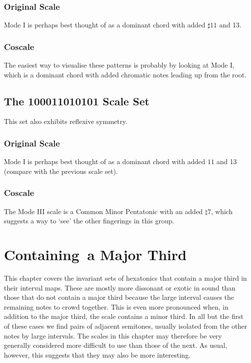 \documentclass[english]{./gbook}
\begin{document}
\begin{large}
\subsection*{Original Scale}
Mode I is perhaps best thought of as a dominant chord with added $\sharp11$ and 13.
\subsection*{Coscale}
The easiest way to visualise these patterns is probably by looking at Mode I, which is a dominant chord with added chromatic notes leading up from the root.

\section{The 100011010101 Scale Set}
This set also exhibits reflexive symmetry.
\subsection*{Original Scale}
Mode I is perhaps best thought of as a dominant chord with added $11$ and 13 (compare with the previous scale set).
\subsection*{Coscale}
The Mode III scale is a Common Minor Pentatonic with an added $\natural7$, which suggests a way to `see' the other fingerings in this group.







\chapter{\mbox{Containing a} \mbox{Major} \mbox{Third}}

This chapter covers the invariant sets of hexatonics that contain a major third in their interval maps. These are mostly more dissonant or exotic in sound than those that do not contain a major third because the large interval causes the remaining notes to crowd together. This is even more pronounced when, in addition to the major third, the scale contains a minor third. In all but the first of these cases we find pairs of adjacent semitones, usually isolated from the other notes by large intervals. The scales in this chapter may therefore be very generally considered more difficult to use than those of the next. As usual, however, this suggests that they may also be more interesting.


\end{large}
\end{document}
